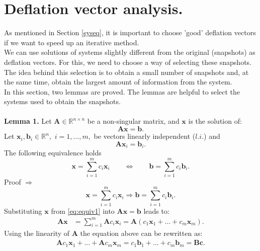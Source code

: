 \documentclass[12pt]{article}
\begin{document}
\section{Deflation vector analysis.}\label{as}
As mentioned in Section \ref{syseq}, it is important to choose 'good' deflation vectors if we want to speed up an iterative method.\\ 
We can use solutions of systems slightly different from the original (snapshots) as deflation vectors.
For this, we need to choose a way of selecting these snapshots. The idea behind this selection is to obtain a small number of snapshots and, at the same time,
obtain the largest amount of information from the system.\\
In this section, two lemmas are proved. The lemmas are helpful to select the systems used to obtain the snapshots.\\\\
\textbf{Lemma 1.} 
Let $\mathbf{A} \in \mathbb{R}^{n\times n}$ be a non-singular matrix, and $\mathbf{x}$ is the solution of:
\begin{equation}\label{eq:ls}
\mathbf{A}\mathbf{x}=\mathbf{b}.
\end{equation}
Let $ \mathbf{x}_i, \mathbf{b}_i \in \mathbb{R}^{n},$ $i=1,...,m,$ be
vectors linearly independent ($l.i.$) and 
\begin{equation}\label{eq:lieq}
\mathbf{A}\mathbf{x}_i=\mathbf{b}_i.
\end{equation}
The following equivalence holds
\begin{equation}\label{eq:equiv}
\mathbf{x}=\sum_{i=1}^m {c}_i\mathbf{x}_i \qquad
\Leftrightarrow \qquad
\mathbf{b}=\sum_{i=1}^m {c}_i\mathbf{b}_i.
\end{equation}
Proof $\Rightarrow$
\begin{equation}\label{eq:equiv1}
\mathbf{x}=\sum_{i=1}^m {c}_i\mathbf{x}_i 
\Rightarrow 
\mathbf{b}=\sum_{i=1}^m {c}_i\mathbf{b}_i.
\end{equation}
Substituting $\mathbf{x}$ from \eqref{eq:equiv1} into $\mathbf{A}\mathbf{x}=\mathbf{b}$ leads to:
\begin{align*}
\mathbf{A}\mathbf{x}&=\sum_{i=1}^m \mathbf{A}{c}_i\mathbf{x}_i=\mathbf{A}(c_1\mathbf{x}_1+...+c_m\mathbf{x}_m).
\end{align*}
Using the linearity of $\mathbf{A}$ the equation above can be rewritten as:
\begin{align}\label{eq:bc}
\mathbf{A}c_1\mathbf{x}_1+...+\mathbf{A}c_m\mathbf{x}_m
=c_1\mathbf{b}_1+...+c_m\mathbf{b}_m=\mathbf{B}\mathbf{c}.
\end{align}
\end{document}
